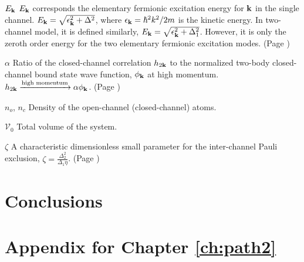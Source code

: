 \documentclass[edeposit,fullpage,prequest,10pt]{uiucthesis2009}
\begin{document}
\begin{symbollist}[0.7in]
\item[$E_{\mathbf{k}}$] $E_{\mathbf{k}}$ corresponds the elementary fermionic excitation energy for $\mathbf{k}$ in the single channel.  $E_{\mathbf{k}}=\sqrt{\epsilon_{\mathbf{k}}^{2}+\Delta^{2}}$, where $\epsilon_{\mathbf{k}}=\hbar^{2}k^{2}/2m$ is the kinetic energy. In two-channel model, it is defined similarly, $E_{\mathbf{k}}=\sqrt{\epsilon_{\mathbf{k}}^{2}+\Delta_{1}^{2}}$. However, it is only the zeroth order   energy for the two elementary fermionic excitation modes. (Page \pageref{eq:pathInt:G0})
\item[$\alpha$]  Ratio of the closed-channel correlation $h_{2\mathbf{k}}$ to the normalized two-body closed-channel bound state wave function, $\phi_{\mathbf{k}}$ at high momentum.  $h_{2\mathbf{k}}\xrightarrow{\text{high momentum}}\alpha\phi_{\mathbf{k}}$. (Page \pageref{eq:pathInt2:hphi})
\item[$n_{o}$, $n_{c}$] Density of the open-channel (closed-channel) atoms. 
\item[$\mathcal{V}_{0}$]  Total volume of the system. 
\item[$\zeta$] A characteristic dimensionless small parameter for the inter-channel Pauli exclusion, $\zeta=\frac{\Delta_{2}^{2}}{\Delta_{1}\eta}$. (Page \pageref{eq:pathInt2:zetaDef})
\end{symbollist}

\mainmatter




\chapter{Conclusions\label{ch:conclusion}}


\appendix

%

\chapter{Appendix for Chapter \ref{ch:path2}}


\backmatter



\end{document}
